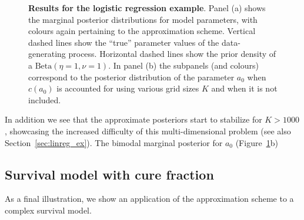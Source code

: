 \documentclass[a4paper, notitlepage, 11pt]{article}
\begin{document}
\begin{figure}[!ht]
\hfill
{}
\hfill
{}
\hfill
\caption{\textbf{Results for the logistic regression example}.
Panel (a) shows the marginal posterior distributions for model parameters, with colours again pertaining to the approximation scheme.
Vertical dashed lines show the ``true'' parameter values of the data-generating process.
Horizontal dashed lines show the prior density of a $\text{Beta}(\eta = 1, \nu = 1)$.
In panel (b) the subpanels (and colours) correspond to the posterior distribution of the parameter $a_0$ when $c(a_0)$ is accounted for using various grid sizes $K$ and when it is not included.
}
\label{fig:logistic_regression}
\end{figure}

In addition we see that the approximate posteriors start to stabilize for $K > 1000$, showcasing the increased difficulty of this  multi-dimensional problem (see also Section~\ref{sec:linreg_ex}).
The bimodal marginal posterior for $a_0$ (Figure~\ref{fig:logistic_regression}b) 

\subsection{Survival model with cure fraction}
\label{sec:survival}

As a final illustration, we show an application of the approximation scheme to a complex survival model.
\end{document}
